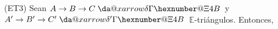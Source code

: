 \documentclass[preview]{standalone}
\makeatletter
\newcommand*{\da@xarrow}[7]{%
                                 \sbox0{$\ifx#7\scriptstyle\scriptscriptstyle\else\scriptstyle\fi#5#1#6\m@th$}%
                                 \sbox2{$\ifx#7\scriptstyle\scriptscriptstyle\else\scriptstyle\fi#5#2#6\m@th$}%
                                 \sbox4{$#7\dabar@\m@th$}%
                                 \dimen@=\wd0 %
                                 \ifdim\wd2 >\dimen@
                                   \dimen@=\wd2 %
                                 \fi
                                 \count@=2 %
                                 \def\da@bars{\dabar@\dabar@}%
                                 \@whiledim\count@\wd4<\dimen@\do{%
                                   \advance\count@\@ne
                                   \expandafter\def\expandafter\da@bars\expandafter{%
                                     \da@bars
                                     \dabar@ 
                                   }%
                                 }%
                                 \mathrel{#3}%
                                 \mathrel{%
                                   \mathop{\da@bars}\limits
                                   \ifx\\#1\\%
                                   \else
                                     _{\copy0}%
                                   \fi
                                   \ifx\\#2\\%
                                   \else
                                     ^{\copy2}%
                                   \fi
                                 }%
                                 \mathrel{#4}%
                               }
\newcommand*{\da@rightarrow}{\mathchar"0\hexnumber@\symAMSa 4B }
\newcommand*{\xdashrightarrow}[2][]{%
                                 \mathrel{%
                                   \mathpalette{\da@xarrow{#1}{#2}{}\da@rightarrow{\,}{}}{}%
                                 }%
                               }
\makeatother
\begin{document}
\begin{center}
(ET3) Sean $A\to B\to C\xdashrightarrow{\delta}$ y $A'\to B'\to C'\xdashrightarrow{\delta'}$ $\mathbb{E}$-triángulos. Entonces,
\end{center}
\end{document}
